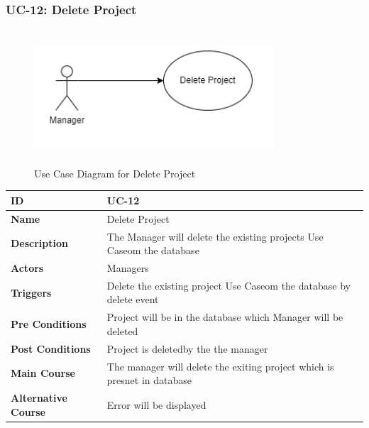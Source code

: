 \subsubsection{UC-12: Delete Project}
\begin{figure}[H]
    \includegraphics[height=5cm, width=0.8\textwidth]{./diagrams/Use Case/u12.png}
    \centering
    \caption{Use Case Diagram for Delete Project}
    \label{fig:Usecase1}
\end{figure}

\begin{center}
    \begin{tabularx}{\textwidth}{|l|X|}
        \hline
        \textbf{ID}                 & UC-12                                                                    \\
        \hline
        \textbf{Name}               & Delete Project                                                           \\
        \hline
        \textbf{Description}        & The Manager will delete the existing projects Use Caseom the database    \\
        \hline
        \textbf{Actors}             & Managers                                                                 \\
        \hline
        \textbf{Triggers}           & Delete the existing project Use Caseom the database by delete event      \\
        \hline
        \textbf{Pre Conditions}     & Project will be in the database which Manager will be deleted            \\
        \hline
        \textbf{Post Conditions}    & Project is deletedby the the manager                                     \\
        \hline
        \textbf{Main Course}        & The manager will delete the exiting project which is presnet in database \\
        \hline
        \textbf{Alternative Course} & Error will be displayed                                                  \\
        \hline
    \end{tabularx}
\end{center}
\newpage


